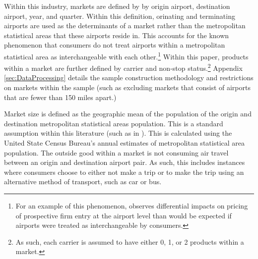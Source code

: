 \documentclass{article}
\begin{document}
	 Within this industry, markets are defined by by origin airport, destination airport, year, and quarter. Within this definition, orinating and terminating airports are used as the determinants of a market rather than the metropolitan statistical areas that these airports reside in. This accounts for the known phenomenon that consumers do not treat airports within a metropolitan statistical area as interchangeable with each other.\footnote{For an example of this phenomenon, \citet{goolsbee_how_2008} observes differential impacts on pricing of prospective firm entry at the airport level than would be expected if airports were treated as interchangeable by consumers.} Within this paper, products within a market are further defined by carrier and non-stop status.\footnote{As such, each carrier is assumed to have either 0, 1, or 2 products within a market.} Appendix \ref{sec:DataProcessing} details the sample construction methodology and restrictions on markets within the sample (such as excluding markets that consist of airports that are fewer than 150 miles apart.)
	
	Market size is defined as the geographic mean of the population of the origin and destination metropolitan statistical areas population. This is a standard assumption within this literature (such as in \citep{ciliberto_market_2021}). This is calculated using the United State Census Bureau's annual estimates of metropolitan statistical area population. The outside good within a market is not consuming air travel between an origin and destination airport pair. As such, this includes instances where consumers choose to either not make a trip or to make the trip using an alternative method of transport, such as car or bus. 

	
\end{document}
